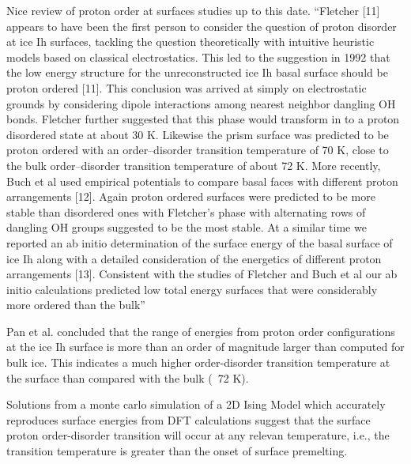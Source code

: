 Nice review of proton order at surfaces studies up to this date.
``Fletcher [11] appears to have been the first person to consider the
question of proton disorder at ice Ih surfaces, tackling the question
theoretically with intuitive heuristic models based on classical
electrostatics. This led to the suggestion in 1992 that the low energy
structure for the unreconstructed ice Ih basal surface should be
proton ordered [11]. This conclusion was arrived at simply on
electrostatic grounds by considering dipole interactions among nearest
neighbor dangling OH bonds. Fletcher further suggested that this phase
would transform in to a proton disordered state at about 30
K. Likewise the prism surface was predicted to be proton ordered with
an order–disorder transition temperature of 70 K, close to the bulk
order–disorder transition temperature of about 72 K. More recently,
Buch et al used empirical potentials to compare basal faces with
different proton arrangements [12]. Again proton ordered surfaces were
predicted to be more stable than disordered ones with Fletcher’s phase
with alternating rows of dangling OH groups suggested to be the most
stable. At a similar time we reported an ab initio determination of
the surface energy of the basal surface of ice Ih along with a
detailed consideration of the energetics of different proton
arrangements [13]. Consistent with the studies of Fletcher and Buch et
al our ab initio calculations predicted low total energy surfaces that
were considerably more ordered than the bulk''

Pan et al. concluded that the range of energies from proton order
configurations at the ice Ih surface is more than an order of
magnitude larger than computed for bulk ice. This indicates a much
higher order-disorder transition temperature at the surface than
compared with the bulk (~72 K).

Solutions from a monte carlo simulation of a 2D Ising Model which
accurately reproduces surface energies from DFT calculations suggest
that the surface proton order-disorder transition will occur at any
relevan temperature, i.e., the transition temperature is greater than
the onset of surface premelting.

